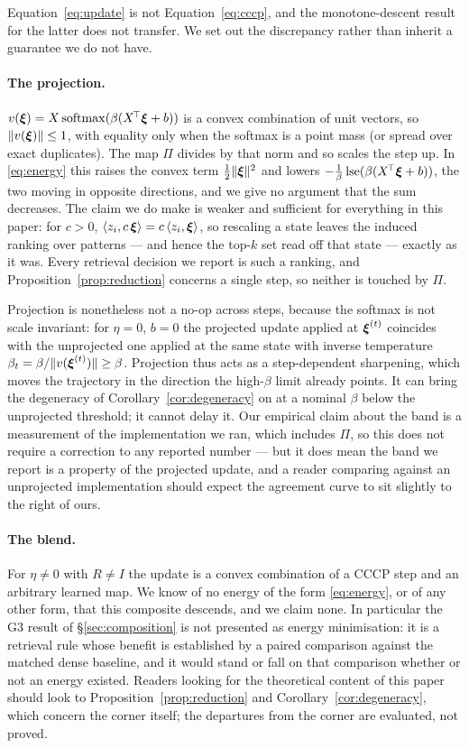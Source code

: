 Equation~\eqref{eq:update} is not Equation~\eqref{eq:cccp}, and the monotone-descent result
for the latter does not transfer. We set out the discrepancy rather than inherit a guarantee
we do not have.

\paragraph{The projection.} $v(\boldsymbol{\xi}) = X\operatorname{softmax}(\beta(X^{\!\top}\boldsymbol{\xi}+b))$ is a convex combination
of unit vectors, so $\|v(\boldsymbol{\xi})\| \le 1$, with equality only when the softmax is a point mass
(or spread over exact duplicates). The map $\Pi$ divides by that norm and so scales the step
up. In \eqref{eq:energy} this raises the convex term $\tfrac12\|\boldsymbol{\xi}\|^2$ and lowers
$-\tfrac1\beta\operatorname{lse}(\beta(X^{\!\top}\boldsymbol{\xi}+b))$, the two moving in opposite directions, and we
give no argument that the sum decreases. The claim we do make is weaker and sufficient for
everything in this paper: for $c>0$, $\langle z_i, c\,\boldsymbol{\xi}\rangle = c\,\langle
z_i,\boldsymbol{\xi}\rangle$, so rescaling a state leaves the induced ranking over patterns --- and hence
the top-$k$ set read off that state --- exactly as it was. Every retrieval decision we report
is such a ranking, and Proposition~\ref{prop:reduction} concerns a single step, so neither is
touched by $\Pi$.

Projection is nonetheless not a no-op across steps, because the softmax is not scale
invariant: for $\eta{=}0$, $b{=}0$ the projected update applied at $\boldsymbol{\xi}^{(t)}$ coincides with
the unprojected one applied at the same state with inverse temperature
$\beta_t = \beta/\|v(\boldsymbol{\xi}^{(t)})\| \ge \beta$. Projection thus acts as a step-dependent
sharpening, which moves the trajectory in the direction the high-$\beta$ limit already points.
It can bring the degeneracy of Corollary~\ref{cor:degeneracy} on at a nominal $\beta$ below
the unprojected threshold; it cannot delay it. Our empirical claim about the band is a
measurement of the implementation we ran, which includes $\Pi$, so this does not require a
correction to any reported number --- but it does mean the band we report is a property of the
projected update, and a reader comparing against an unprojected implementation should expect
the agreement curve to sit slightly to the right of ours.

\paragraph{The blend.} For $\eta \neq 0$ with $R \neq I$ the update is a convex combination of
a CCCP step and an arbitrary learned map. We know of no energy of the form \eqref{eq:energy},
or of any other form, that this composite descends, and we claim none. In particular the G3
result of \S\ref{sec:composition} is not presented as energy minimisation: it is a retrieval
rule whose benefit is established by a paired comparison against the matched dense baseline,
and it would stand or fall on that comparison whether or not an energy existed. Readers
looking for the theoretical content of this paper should look to
Proposition~\ref{prop:reduction} and Corollary~\ref{cor:degeneracy}, which concern the corner
itself; the departures from the corner are evaluated, not proved.

